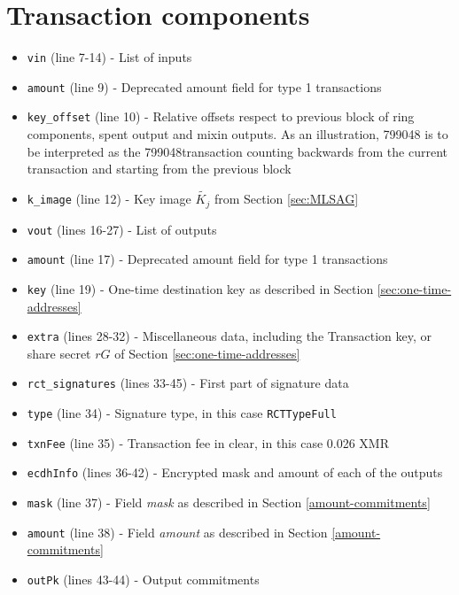 \begin{appendices}
\begin{Verbatim}[commandchars=\\\{\}, numbers=left]
\end{Verbatim}

\section*{Transaction components}
	
\begin{itemize}
	\item {\tt vin} (line 7-14) - List of inputs
	\item {\tt amount} (line 9) - Deprecated amount field for type 1 transactions
	\item {\tt key\_offset} (line 10) - Relative offsets respect to previous block of ring components, spent output and mixin outputs. As an illustration, 799048 is to be interpreted as the 799048\nth transaction counting backwards from
	the current transaction and starting from the previous block
	\item {\tt k\_image} (line 12) - Key image \(\tilde{K_j}\) from Section \ref{sec:MLSAG}
	\item {\tt vout} (lines 16-27) - List of outputs
	\item {\tt amount} (line 17) - Deprecated amount field for type 1 transactions
	\item {\tt key} (line 19) - One-time destination key as described in Section \ref{sec:one-time-addresses}
	\item {\tt extra} (lines 28-32) - Miscellaneous data, including the Transaction key, or share secret \(rG\) of
	    Section \ref{sec:one-time-addresses}
	\item {\tt rct\_signatures} (lines 33-45) - First part of signature data
	\item {\tt type} (line 34) - Signature type, in this case {\tt RCTTypeFull}
	\item {\tt txnFee} (line 35) - Transaction fee in clear, in this case 0.026 XMR
	\item {\tt ecdhInfo} (lines 36-42) - Encrypted mask and amount of each of the outputs
	\item {\tt mask} (line 37) - Field {\sl mask} as described  in Section \ref{amount-commitments}
    \item {\tt amount} (line 38) - Field {\sl amount} as described in Section \ref{amount-commitments}
    \item {\tt outPk} (lines 43-44) - Output commitments
    

\end{itemize}
\end{appendices}
